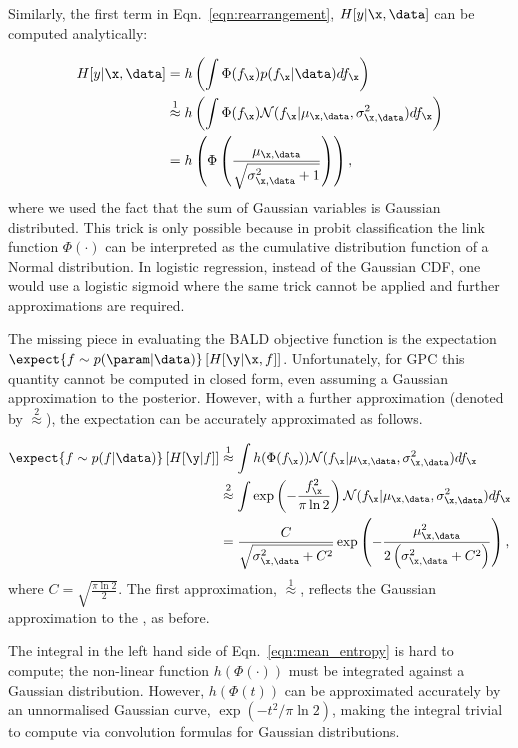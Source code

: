 Similarly, the first term in Eqn.\ \eqref{eqn:rearrangement}, $H[y\vert\x,\data]$ can be computed analytically:

\begin{align}
	H[y\vert\x,\data] &= h\left( \int \Phi( f_{\x} ) p(f_{\x}\vert\data) df_{\x} \right)\\
	&\stackrel{1}{\approx} h\left( \int \Phi( f_{\x} )  \mathcal{N}(f_{\x}\vert \mu_{\x,\data},\sigma_{\x,\data}^2) df_{\x} \right) \\
	&= h \left( \Phi\left( \frac{\mu_{\x,\data}}{\sqrt{\sigma^2_{\x,\data} + 1}} \right)\right)\label{ent_mean},
\end{align}
where we used the fact that the sum of Gaussian variables is Gaussian distributed. This trick is only possible because in probit classification the link function $\Phi(\cdot)$ can be interpreted as the cumulative distribution function of a Normal distribution. In logistic regression, instead of the Gaussian CDF, one would use a logistic sigmoid where the same trick cannot be applied and further approximations are required.

The missing piece in evaluating the BALD objective function is the expectation $\expect{f\sim p(\param|\data)} \left[ H[\y \vert \x,f] \right]$. Unfortunately, for GPC this quantity cannot be computed in closed form, even assuming a Gaussian approximation to the posterior. However, with a further approximation (denoted by $\stackrel{2}{\approx}$), the expectation can be accurately approximated as follows.

\begin{align}
	\expect{f \sim p(f\vert\data)} \left[ H[\y\vert f] \right] &\stackrel{1}{\approx}\int h(\Phi(f_{\x})) \mathcal{N}(f_{\x}\vert \mu_{\x,\data},\sigma_{\x,\data}^2)df_{\x}\label{eqn:mean_entropy}\\
	&\stackrel{2}{\approx} \int \exp\left(-\frac{f_{\x}^2}{\pi\ln2}\right) \mathcal{N}(f_{\x}\vert \mu_{\x,\data},\sigma_{\x,\data}^2)df_{\x}\\	
	&= \frac{C}{\sqrt{\sigma_{\x,\data}^2 + C^2}}\exp\left(-\frac{\mu_{\x,\data}^2}{2\left(\sigma_{\x,\data}^2 + C^2\right)}\right),
\end{align}
where $C=\sqrt{\frac{\pi\ln2}{2}}$. The first approximation, {\scriptsize $\stackrel{1}{\approx}$}, reflects the Gaussian approximation to the , as before.

The integral in the left hand side of Eqn.\ \eqref{eqn:mean_entropy} is hard to compute; the non-linear function $h(\Phi(\cdot))$ must be integrated against a Gaussian distribution. However, $h(\Phi(t))$ can be approximated accurately by an unnormalised Gaussian curve, $\exp(-t^2/\pi\ln2)$, making the integral trivial to compute via convolution formulas for Gaussian distributions.

